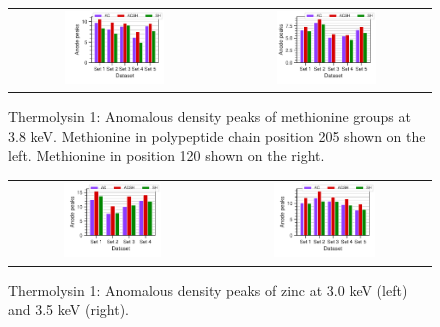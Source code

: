 \begin{figure}
    \centering
    \begin{tabular}{cc}
        \includegraphics[width = 0.5\textwidth]{plots/exp1/tlys_9_P6122/peaks/3p8_met250.pdf} & \includegraphics[width = 0.5\textwidth]{plots/exp1/tlys_9_P6122/peaks/3p8_met120.pdf}
    \end{tabular}
    \caption{Thermolysin 1: Anomalous density peaks of methionine groups at 3.8 \unit{keV}. Methionine in polypeptide chain position 205 shown on the left. Methionine in position 120 shown on the right.}
    \label{fig:tlys9_met_peaks_3p8}
\end{figure}

\begin{figure}
    \centering
    \begin{tabular}{cc}
        \includegraphics[width = 0.5\textwidth]{plots/exp1/tlys_9_P6122/peaks/3p0_zinc.pdf} & \includegraphics[width = 0.5\textwidth]{plots/exp1/tlys_9_P6122/peaks/3p5_zinc.pdf}
    \end{tabular}
    \caption{Thermolysin 1: Anomalous density peaks of zinc at 3.0 \unit{keV} (left) and 3.5 \unit{keV} (right).}
    \label{fig:tlys9_zn_peaks_3p0_3p5}
\end{figure}

